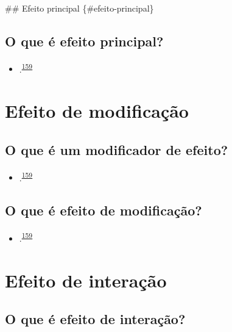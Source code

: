 \documentclass[
  a4paper,
]{book}
\providecommand{\tightlist}{%
  \setlength{\itemsep}{0pt}\setlength{\parskip}{0pt}}
\begin{document}
\#\# Efeito principal \{\#efeito-principal\}

\hypertarget{o-que-uxe9-efeito-principal}{%
\subsection{O que é efeito principal?}\label{o-que-uxe9-efeito-principal}}

\begin{itemize}
\tightlist
\item
  .\textsuperscript{\protect\hyperlink{ref-Bours2023}{159}}
\end{itemize}

\hypertarget{modificacao}{%
\section{Efeito de modificação}\label{modificacao}}

\hypertarget{o-que-uxe9-um-modificador-de-efeito}{%
\subsection{O que é um modificador de efeito?}\label{o-que-uxe9-um-modificador-de-efeito}}

\begin{itemize}
\tightlist
\item
  .\textsuperscript{\protect\hyperlink{ref-Bours2023}{159}}
\end{itemize}

\hypertarget{o-que-uxe9-efeito-de-modificauxe7uxe3o}{%
\subsection{O que é efeito de modificação?}\label{o-que-uxe9-efeito-de-modificauxe7uxe3o}}

\begin{itemize}
\tightlist
\item
  .\textsuperscript{\protect\hyperlink{ref-Bours2023}{159}}
\end{itemize}

\hypertarget{interacao}{%
\section{Efeito de interação}\label{interacao}}

\hypertarget{o-que-uxe9-efeito-de-interauxe7uxe3o}{%
\subsection{O que é efeito de interação?}\label{o-que-uxe9-efeito-de-interauxe7uxe3o}}
\end{document}
